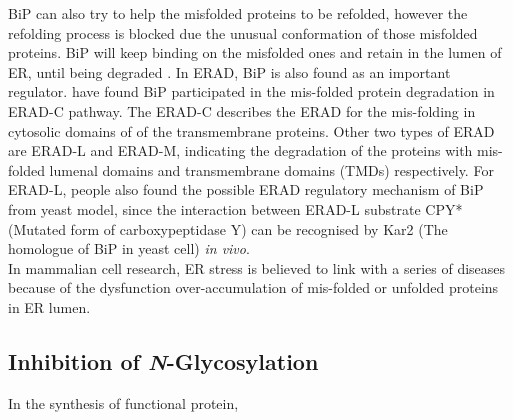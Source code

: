 BiP can also try to help the misfolded proteins to be refolded, however the refolding process is blocked due the unusual conformation of those misfolded proteins. BiP will keep binding on the misfolded ones and retain in the lumen of ER, until being degraded \citep{knittler1995molecular}. In ERAD, BiP is also found as an important regulator. \citet{nishikawa2005roles} have found BiP participated in the mis-folded protein degradation in ERAD-C pathway. The ERAD-C describes the ERAD for the mis-folding in cytosolic domains of of the transmembrane proteins. Other two types of ERAD are ERAD-L and ERAD-M, indicating the degradation of the proteins with mis-folded lumenal domains and transmembrane domains (TMDs) respectively. For ERAD-L, people also found the possible ERAD regulatory mechanism of BiP from yeast model, since the interaction between ERAD-L substrate CPY* (Mutated form of carboxypeptidase Y) can be recognised by Kar2 (The homologue of BiP in yeast cell) \textit{in vivo}.\\
In mammalian cell research, ER stress is believed to link with a series of diseases because of the dysfunction over-accumulation of mis-folded or unfolded proteins in ER lumen. %
\subsection{Inhibition of \textit{N}-Glycosylation}
In the synthesis of functional protein, 
